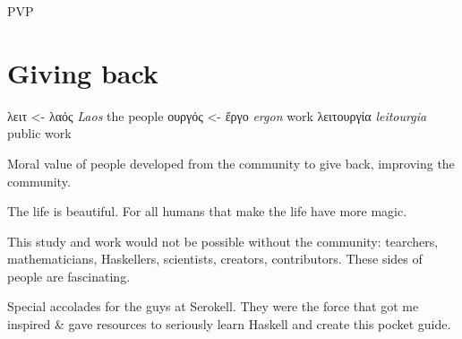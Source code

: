 \documentclass[a4paper,14pt,oneside]{book}
\begin{document}
\label{org84bda1a}PVP

\part{Giving back}
\label{sec:org2f52033}

\textgreek{λειτ}       <- \textgreek{λαός}  \emph{Laos}       the people
    \textgreek{ουργός} <- \textgreek{ἔργο}  \emph{ergon}             work
\textgreek{λειτουργία}          \emph{leitourgia} public work

Moral value of people developed from the community to give back, improving the community.

The life is beautiful.
For all humans that make the life have more magic.

This study and work would not be possible without the community: tearchers, mathematicians, Haskellers, scientists, creators, contributors. These sides of people are fascinating.


Special accolades for the guys at Serokell. They were the force that got me inspired \& gave resources to seriously learn Haskell and create this pocket guide.
\end{document}
